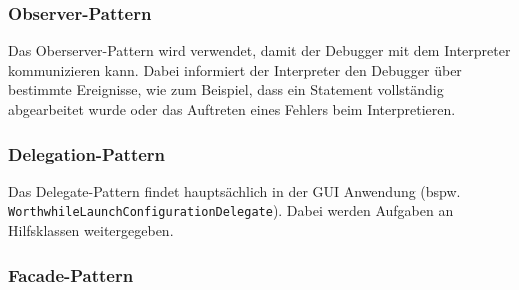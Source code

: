\subsubsection{Observer-Pattern}
Das Oberserver-Pattern wird verwendet, damit der Debugger mit dem Interpreter kommunizieren kann. Dabei informiert der Interpreter den Debugger über bestimmte Ereignisse, wie zum Beispiel, dass ein Statement vollständig abgearbeitet wurde oder das Auftreten eines Fehlers beim Interpretieren. 

\subsubsection{Delegation-Pattern}
Das Delegate-Pattern findet hauptsächlich in der GUI Anwendung (bspw. \texttt{WorthwhileLaunchConfigurationDelegate}). Dabei werden Aufgaben an Hilfsklassen weitergegeben.

\subsubsection{Facade-Pattern}


\subsubsection{}

